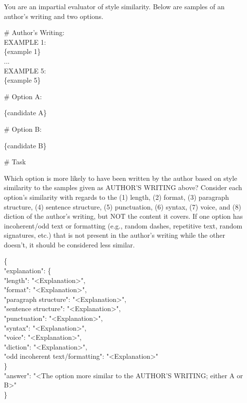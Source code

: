 \begin{figure*}
    \centering
\begin{tcolorbox}[
width=1.0\textwidth
]
\fontsize{8pt}{8pt}\selectfont
\ttfamily
You are an impartial evaluator of style similarity. Below are samples of an author's writing and two options. 

\vspace{2mm}

\# Author's Writing:\\ 
EXAMPLE 1: \\ 
\{example 1\}\\ 
...\\ 
EXAMPLE 5: \\ 
\{example 5\} 

\vspace{2mm}

\# Option A:

\{candidate A\}

\vspace{2mm}

\# Option B:

\{candidate B\}

\vspace{2mm}

\# Task

Which option is more likely to have been written by the author based on style similarity to the samples given as AUTHOR'S WRITING above? Consider each option's similarity with regards to the (1) length, (2) format, (3) paragraph structure, (4) sentence structure, (5) punctuation, (6) syntax, (7) voice, and (8) diction of the author's writing, but NOT the content it covers. If one option has incoherent/odd text or formatting (e.g., random dashes, repetitive text, random signatures, etc.) that is not present in the author's writing while the other doesn't, it should be considered less similar.

\{ \\
\phantom{xx}"explanation": \{ \\ 
\phantom{xx}\phantom{xx}"length": "<Explanation>", \\ 
\phantom{xx}\phantom{xx}    "format": "<Explanation>", \\ 
\phantom{xx}\phantom{xx}    "paragraph structure": "<Explanation>", \\ 
\phantom{xx}\phantom{xx}    "sentence structure": "<Explanation>", \\ 
\phantom{xx}\phantom{xx}    "punctuation": "<Explanation>", \\ 
\phantom{xx}\phantom{xx}    "syntax": "<Explanation>", \\ 
\phantom{xx}\phantom{xx}    "voice": "<Explanation>", \\ 
\phantom{xx}\phantom{xx}    "diction": "<Explanation>", \\ 
\phantom{xx}\phantom{xx}    "odd incoherent text/formatting": "<Explanation>" \\ 
\phantom{xx} \} \\ 
\phantom{xx}"answer":  "<The option more similar to the AUTHOR'S WRITING; either A or B>" \\ 
\}


\end{tcolorbox}
\end{figure*}
